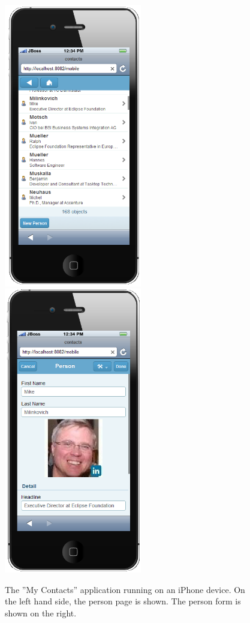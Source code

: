 \documentclass[a4paper,10pt,twoside]{book}
\begin{document}
\begin{figure}
\includegraphics[width=6cm]{my_contacts_rapmobile_1.png} \hspace{5mm}
\includegraphics[width=6cm]{my_contacts_rapmobile_2.png} \hspace{5mm}
\caption{The ''My Contacts'' application running on an iPhone device. 
On the left hand side, the person page is shown. The person form is shown on the right. }
\end{figure}
\end{document}
